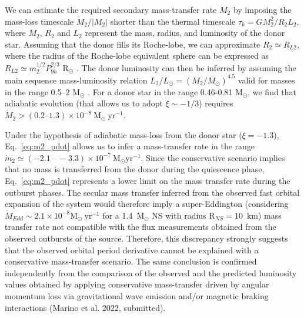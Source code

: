 \documentclass[fleqn,usenatbib]{mnras}
\begin{document}
We can estimate the required secondary mass-transfer rate $\dot{M}_2$ by imposing the mass-loss timescale $\dot{M}_2/|M_2|$ shorter than the thermal timescale $\tau_k=GM_2^2/R_2L_2$, where $M_2$, $R_2$ and $L_2$ represent the mass, radius, and luminosity of the donor star. Assuming that the donor fills its Roche-lobe, we can approximate $R_2\simeq R_{L2}$, where the radius of the Roche-lobe equivalent sphere can be expressed as $R_{L2}\simeq m_2^{1/2} P_{9h}^{2/3}$ R$_\odot$ \citep[obtained by combining Paczy\'nski's Roche-lobe analytic approximation with Kepler's third law;][]{Paczynski71}. The donor luminosity can then be inferred by assuming the main sequence mass-luminosity relation $L_2/L_{\odot}=(M_2/M_{\odot})^{4.5}$ valid for masses in the range 0.5--2 M$_\odot$ \citep{Chabrier:2009vh}. For a donor star in the range 0.46-0.81 M$_\odot$, we find that adiabatic evolution (that allows us to adopt $\xi\sim-1/3$) requires $\dot{M}_2>(0.2\mbox{--}1.3)\times 10^{-8}~\text{M}_{\odot}~\text{yr}^{-1}$.

Under the hypothesis of adiabatic mass-loss from the donor star ($\xi=-1.3$), Eq.~\ref{eq:m2_pdot} allows us to infer a mass-transfer rate in the range $\dot{m}_{2}\simeq(-2.1 ~\mbox{--}~ -3.3)\times 10^{-7}~\text{M}_{\odot} \text{yr}^{-1}$. Since the conservative scenario implies that no mass is transferred from the donor during the quiescence phase, Eq.~\ref{eq:m2_pdot} represents a lower limit on the mass transfer rate during the outburst phases. The secular mass transfer inferred from the observed fast orbital expansion of the system would therefore imply a super-Eddington (considering $\dot{M}_{Edd}\sim2.1\times 10^{-8} \text{M}_{\odot}~\text{yr}^{-1}$ for a 1.4~$\text{M}_{\odot}$ NS with radius $\text{R}_{NS}=10$~km) mass transfer rate not compatible with the flux measurements obtained from the observed outbursts of the source. Therefore, this discrepancy strongly suggests that the observed orbital period derivative cannot be explained with a conservative mass-transfer scenario. The same conclusion is confirmed independently from the comparison of the observed and the predicted luminosity values obtained by applying conservative mass-transfer driven by angular momentum loss via gravitational wave emission and/or magnetic braking interactions (Marino et al. 2022, submitted).
\end{document}
